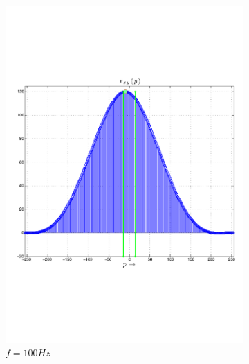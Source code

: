 \begin{figure}
        \centering
        \begin{subfigure}[b]{0.48\textwidth}
                \centering
                \includegraphics[width=\textwidth]{grafiken/02_Konzeptionierung/sine_rxy_f_100}
                \caption{$f=100Hz$}
                \label{fig:sine_rxy_f_100}
        \end{subfigure}
        ~ %
        \begin{subfigure}[b]{0.48\textwidth}
                \centering

\end{subfigure}
\end{figure}
